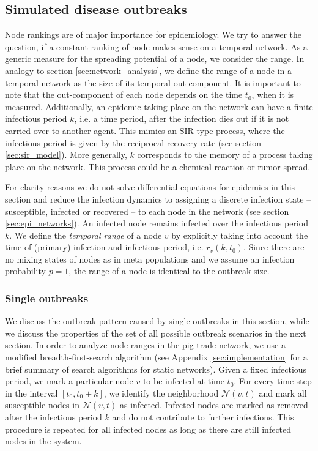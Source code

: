 \subsection{Simulated disease outbreaks}
Node rankings are of major importance for epidemiology.
We try to answer the question, if a constant ranking of node makes sense on a temporal network.
As a generic measure for the spreading potential of a node, we consider the range.
In analogy to section \ref{sec:network_analysis}, we define the range of a node in a temporal network as the size of its temporal out-component.
It is important to note that the out-component of each node depends on the time $t_0$, when it is measured.
Additionally, an epidemic taking place on the network can have a finite infectious period $k$, i.e. a time period, after the infection dies out if it is not carried over to another agent.
This mimics an SIR-type process, where the infectious period is given by the reciprocal recovery rate (see section \ref{sec:sir_model}).
More generally, $k$ corresponds to the memory of a process taking place on the network.
This process could be a chemical reaction or rumor spread.

For clarity reasons we do not solve differential equations for epidemics in this section and reduce the infection dynamics to assigning a discrete infection state -- susceptible, infected or recovered -- to each node in the network (see section \ref{sec:epi_networks}).
An infected node remains infected over the infectious period $k$.
We define the \emph{temporal range} of a node $v$ by explicitly taking into account the time of (primary) infection and infectious period, i.e. $r_v (k,t_0)$.
Since there are no mixing states of nodes as in meta populations and we assume an infection probability $p=1$, the range of a node is identical to the outbreak size. 

\subsubsection{Single outbreaks}
We discuss the outbreak pattern caused by single outbreaks in this section, while we discuss the properties of the set of all possible outbreak scenarios in the next section.
In order to analyze node ranges in the pig trade network, we use a modified breadth-first-search algorithm (see Appendix \ref{sec:implementation} for a brief summary of search algorithms for static networks).
Given a fixed infectious period, we mark a particular node $v$ to be infected at time $t_0$.
For every time step in the interval $[t_0,t_0+k]$, we identify the neighborhood $\mathcal{N}(v,t)$ and mark all susceptible nodes in $\mathcal{N}(v,t)$ as infected.
Infected nodes are marked as removed after the infectious period $k$ and do not contribute to further infections.
This procedure is repeated for all infected nodes as long as there are still infected nodes in the system.

